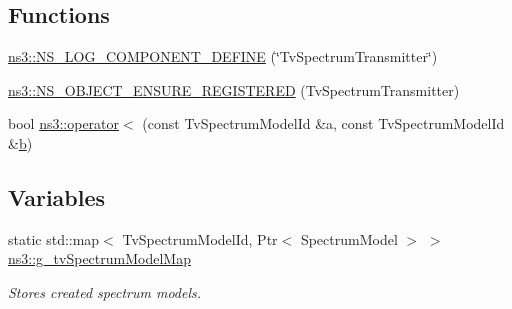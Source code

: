 \subsection*{Functions}
\begin{DoxyCompactItemize}
\item 
\hyperlink{namespacens3_a2b9dcaa325e6617a6381168fa88dfc06}{ns3\+::\+N\+S\+\_\+\+L\+O\+G\+\_\+\+C\+O\+M\+P\+O\+N\+E\+N\+T\+\_\+\+D\+E\+F\+I\+NE} (\char`\"{}Tv\+Spectrum\+Transmitter\char`\"{})
\item 
\hyperlink{namespacens3_adcac7d57a374fe5228ceebd5d3d506cb}{ns3\+::\+N\+S\+\_\+\+O\+B\+J\+E\+C\+T\+\_\+\+E\+N\+S\+U\+R\+E\+\_\+\+R\+E\+G\+I\+S\+T\+E\+R\+ED} (Tv\+Spectrum\+Transmitter)
\item 
bool \hyperlink{namespacens3_ab4fd4563eb37d4f7c96470bcfa95c56f}{ns3\+::operator$<$} (const Tv\+Spectrum\+Model\+Id \&a, const Tv\+Spectrum\+Model\+Id \&\hyperlink{lte__pathloss_8m_a21ad0bd836b90d08f4cf640b4c298e7c}{b})
\end{DoxyCompactItemize}
\subsection*{Variables}
\begin{DoxyCompactItemize}
\item 
static std\+::map$<$ Tv\+Spectrum\+Model\+Id, Ptr$<$ Spectrum\+Model $>$ $>$ \hyperlink{namespacens3_af72014a4f217531f5f79af77a80c9b6d}{ns3\+::g\+\_\+tv\+Spectrum\+Model\+Map}
\begin{DoxyCompactList}\small\item\em Stores created spectrum models. \end{DoxyCompactList}\end{DoxyCompactItemize}

